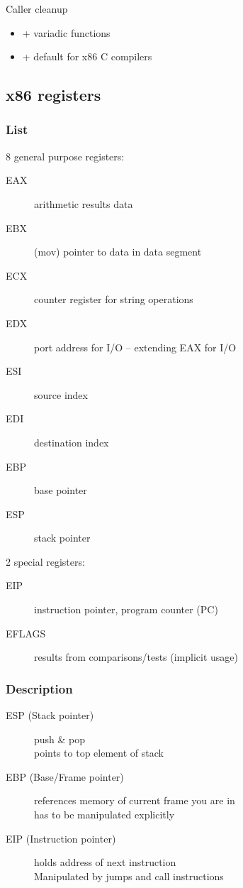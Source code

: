 \documentclass[a4paper,twocolumn]{article}
\begin{document}
\noindent
Caller cleanup

\begin{itemize}
  \item + variadic functions
  \item + default for x86 C compilers
\end{itemize}

\subsection{x86 registers}

\subsubsection{List}

8 general purpose registers:

\begin{description}
  \item[EAX] arithmetic results data
  \item[EBX] (mov) pointer to data in data segment
  \item[ECX] counter register for string operations
  \item[EDX] port address for I/O -- extending EAX for I/O
  \item[ESI] source index
  \item[EDI] destination index
  \item[EBP] base pointer
  \item[ESP] stack pointer
\end{description}

2 special registers:

\begin{description}
  \item[EIP] instruction pointer, program counter (PC)
  \item[EFLAGS] results from comparisons/tests (implicit usage)
\end{description}

\subsubsection{Description}

\begin{description}
  \item[ESP (Stack pointer)]
        push \& pop \\
        points to top element of stack
  \item[EBP (Base/Frame pointer)]
        references memory of current frame you are in \\
        has to be manipulated explicitly
  \item[EIP (Instruction pointer)]
        holds address of next instruction \\
        Manipulated by jumps and call instructions
\end{description}
\end{document}
